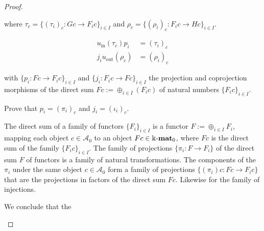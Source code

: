 \begin{proof}
\begin{enumerate}
\begin{subproof}[Proof of (ii)]
where $\tau_{c} = \{ (\tau_{i})_{c} : Gc \rightarrow F_{i} c \}_{i \in I}$ and $\rho_{c} = \{ (\rho_{i})_{c} : F_{i} c \rightarrow Hc \}_{i \in I}$.

\begin{align*}
u_{\mathrm{in}}(\tau_{c}) p_{i} &= (\tau_{i})_{c} \\
j_{i} u_{\mathrm{out}}(\rho_{c}) &= (\rho_{i})_{c}
\end{align*}

with $\{ p_{i} : Fc \rightarrow F_{i}c \}_{i\in I}$ and $\{ j_{i} : F_{i}c \rightarrow Fc \}_{i \in I}$ the projection and coprojection morphisms
of the direct sum $Fc := \oplus_{i\in I} (F_{i} c)$ of natural numbers $\{F_{i} c \}_{i\in I}$.

Prove that $p_{i} = (\pi_{i})_{c}$ and $j_{i} = (\iota_{i})_{c}$.

The direct sum of a family of functors $\{ F_{i}\}_{i \in I}$ is a functor $F := \oplus_{i \in I} F_{i}$, mapping each object $c \in \mathcal{A}_{0}$
to an object $Fc \in \Bbbk\textnormal{-}\mathbf{mat}_{0}$, where $Fc$ is the direct sum of the family $\{ F_{i}c \}_{i \in I}$.
The family of projections $\{ \pi_{i} : F \rightarrow F_{i} \}$ of the direct sum $F$ of functors is a family of natural transformations.
The components of the $\pi_{i}$ under the same object $c \in \mathcal{A}_{0}$ form a family of projections $\{ (\pi_{i})c : Fc \rightarrow F_{i} c\}$
that are the projections in factors of the direct sum $Fc$. Likewise for the family of injections.

We conclude that the 
\end{subproof}


\end{enumerate}
\end{proof}
